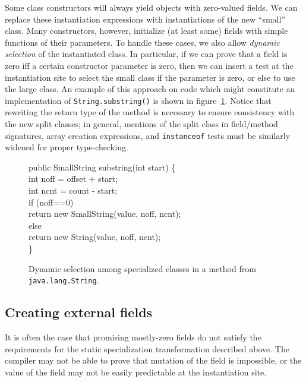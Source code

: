 \documentclass[preprint]{acmconf}
\begin{document}
Some class constructors will always yield objects with zero-valued fields.
We can replace these instantiation expressions
with instantiations of the new ``small'' class.  Many constructors,
however, initialize (at least some) fields with simple functions of their
parameters.  To handle these cases, we also allow {\it dynamic
  selection} of the instantiated class.  In particular, if we can
prove that a field is zero iff a certain constructor parameter is
zero, then we can insert a test at the instantiation site to select
the small class if the parameter is zero, or else to use the large class.
An example of this approach on code which might constitute an
implementation of {\tt String.substring()} is shown in
figure~\ref{fig:dyn-select}.  Notice that rewriting the return type of the
method is necessary to ensure consistency with the new split
classes; in general, mentions of the split class in field/method signatures,
array creation expressions, and {\tt instanceof} tests must be
similarly widened for proper type-checking.


\begin{figure}
\begin{samplecode}
public SmallString substring(int start) \{\\
\>int noff = offset + start;\\
\>int ncnt = count - start;\\
\>if (noff==0)\\
\>\>return new SmallString(value, noff, ncnt);\\
\>else\\
\>\>return new String(value, noff, ncnt);\\
\}\\
\end{samplecode}
\caption{Dynamic selection among specialized classes in a method
  from {\tt java.lang.String}.}
\label{fig:dyn-select}
\end{figure}

\subsection{Creating external fields}
It is often the case that promising mostly-zero fields do not satisfy
the requirements for the static specialization transformation
described above.  The compiler may not be able to prove that mutation
of the field is impossible, or the value of the field may not be
easily predictable at the instantiation site.
\end{document}
